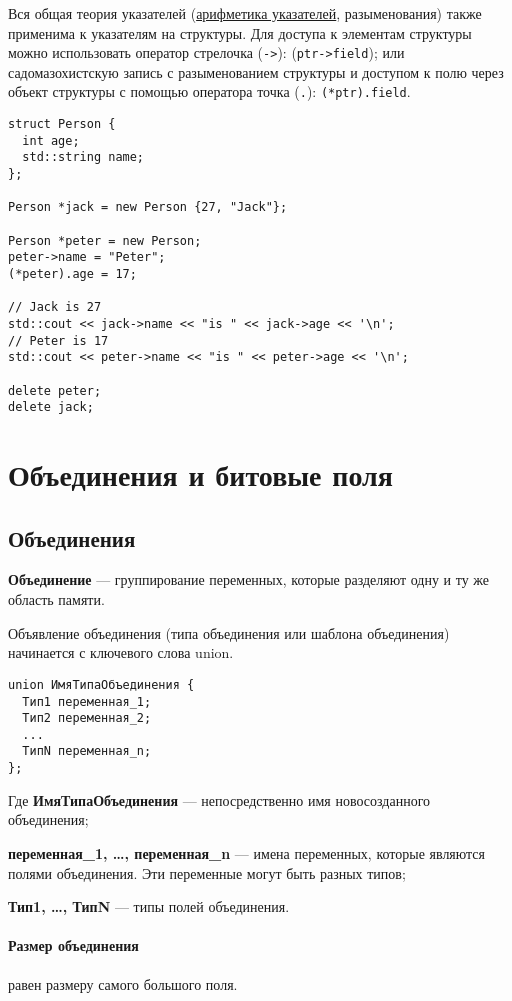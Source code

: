 Вся общая теория указателей (\hyperref[sec:ptr_arithm]{арифметика указателей}, разыменования) также
применима к указателям на структуры. Для доступа к элементам структуры можно использовать
оператор стрелочка (\verb|->|): (\verb|ptr->field|); или садомазохистскую запись с разыменованием структуры
и доступом к полю через объект структуры с помощью оператора точка (\verb|.|): \verb|(*ptr).field|.

\begin{verbatim}
struct Person {
  int age;
  std::string name;
};

Person *jack = new Person {27, "Jack"};

Person *peter = new Person;
peter->name = "Peter";
(*peter).age = 17;

// Jack is 27
std::cout << jack->name << "is " << jack->age << '\n';
// Peter is 17
std::cout << peter->name << "is " << peter->age << '\n';

delete peter;
delete jack;
\end{verbatim}

\section{Объединения и битовые поля}
\subsection*{Объединения}
\textbf{Объединение} --- группирование переменных, которые разделяют одну и ту же область памяти.

Объявление объединения (типа объединения или шаблона объединения) начинается с ключевого слова union.

\begin{verbatim}
union ИмяТипаОбъединения {
  Тип1 переменная_1;
  Тип2 переменная_2;
  ...
  ТипN переменная_n;
};
\end{verbatim}

Где
\textbf{ИмяТипаОбъединения} --- непосредственно имя новосозданного объединения;

\textbf{переменная\_1, \dots, переменная\_n} --- имена переменных, которые являются полями объединения.
Эти переменные могут быть разных типов;

\textbf{Тип1, \dots, ТипN} --- типы полей объединения.

\paragraph{Размер объединения} равен размеру самого большого поля.

